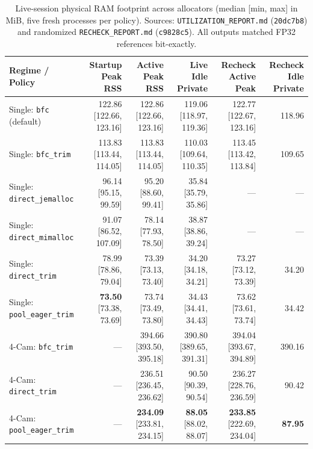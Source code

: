 \documentclass[sigconf,screen,nonacm]{acmart}
\begin{document}
\begin{table}[t]
  \centering
  \caption{Live-session physical RAM footprint across allocators (median [min, max] in MiB, five fresh processes per policy). Sources: \texttt{UTILIZATION\_REPORT.md} (\texttt{20dc7b8}) and randomized \texttt{RECHECK\_REPORT.md} (\texttt{c9828c5}). All outputs matched FP32 references bit-exactly.}
  \label{tab:baseline}
  \small
  \begin{tabular}{@{}lrrrrr@{}}
    \toprule
    \textbf{Regime / Policy} & \textbf{Startup Peak RSS} & \textbf{Active Peak RSS} & \textbf{Live Idle Private} & \textbf{Recheck Active Peak} & \textbf{Recheck Idle Private} \\
    \midrule
    Single: \texttt{bfc} (default)    & 122.86 [122.66, 123.16] & 122.86 [122.66, 123.16] & 119.06 [118.97, 119.36] & 122.77 [122.67, 123.16] & 118.96 \\
    Single: \texttt{bfc\_trim}        & 113.83 [113.44, 114.05] & 113.83 [113.44, 114.05] & 110.03 [109.64, 110.35] & 113.45 [113.42, 113.84] & 109.65 \\
    Single: \texttt{direct\_jemalloc} & 96.14 [95.15, 99.59]    & 95.20 [88.60, 99.41]    & 35.84 [35.79, 35.86]    & ---                     & ---    \\
    Single: \texttt{direct\_mimalloc} & 91.07 [86.52, 107.09]   & 78.14 [77.93, 78.50]    & 38.87 [38.86, 39.24]    & ---                     & ---    \\
    Single: \texttt{direct\_trim}     & 78.99 [78.86, 79.04]    & 73.39 [73.13, 73.40]    & 34.20 [34.18, 34.21]    & 73.27 [73.12, 73.39]    & 34.20  \\
    Single: \texttt{pool\_eager\_trim}& \textbf{73.50} [73.38, 73.69] & 73.74 [73.49, 73.80] & 34.43 [34.41, 34.43]    & 73.62 [73.61, 73.74]    & 34.42  \\
    \midrule
    4-Cam: \texttt{bfc\_trim}         & ---                     & 394.66 [393.50, 395.18] & 390.80 [389.65, 391.31] & 394.04 [393.67, 394.89] & 390.16 \\
    4-Cam: \texttt{direct\_trim}      & ---                     & 236.51 [236.45, 236.62] & 90.50 [90.39, 90.54]    & 236.27 [228.76, 236.59] & 90.42  \\
    4-Cam: \texttt{pool\_eager\_trim} & ---                     & \textbf{234.09} [233.81, 234.15] & \textbf{88.05} [88.02, 88.07] & \textbf{233.85} [222.69, 234.04] & \textbf{87.95} \\
    \bottomrule
  \end{tabular}
\end{table}
\end{document}
